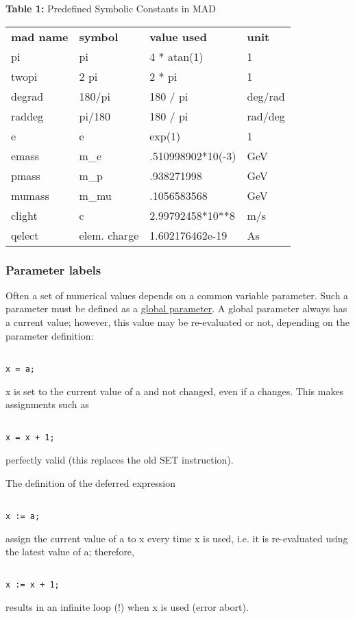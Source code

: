 \begin{table}
\begin{center}
{\textbf{Table 1:} Predefined Symbolic Constants in MAD}
\begin{tabular}{l|l|l|l}
\textbf{mad name} & \textbf{symbol} & \textbf{value used} & \textbf{unit} \\ 
pi & pi & 4 * atan(1) & 1 \\ 
twopi & 2 pi & 2 * pi & 1 \\ 
degrad & 180/pi & 180 / pi & deg/rad \\ 
raddeg & pi/180 & 180 / pi & rad/deg \\ 
e & e & exp(1) & 1 \\ 
emass & m\_e & .510998902*10(-3) & GeV \\ 
pmass & m\_p & .938271998 & GeV \\ 
mumass & m\_mu & .1056583568 & GeV \\ 
clight & c & 2.99792458*10**8 & m/s \\ 
qelect & elem. charge & 1.602176462e-19 & As
\end{tabular}
\end{center}
\end{table}

\subsubsection{Parameter labels} 
Often a set of numerical values depends on a common variable
parameter. Such a parameter must be defined as a
\href{parameter.html}{global parameter}. A global parameter always has a
current value; however, this value may be re-evaluated or not, depending
on the parameter definition:  
\begin{verbatim}

x = a;
\end{verbatim} 
x is set to the current value of a and not changed, even if a
changes. This makes assignments such as  
\begin{verbatim}

x = x + 1;
\end{verbatim} 
perfectly valid (this replaces the old SET instruction). 

The definition of the deferred expression  
\begin{verbatim}

x := a;
\end{verbatim} 
assign the current value of a to x every time x is used, i.e. it is
re-evaluated using the latest value of a; therefore,  
\begin{verbatim}

x := x + 1;
\end{verbatim} 
results in an infinite loop (!) when x is used (error abort). 

